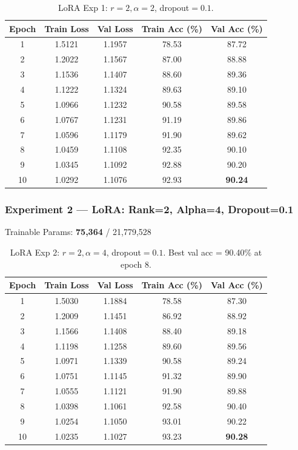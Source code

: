 \documentclass[11pt,a4paper]{article}
\begin{document}
\begin{table}[H]
\centering
\begin{tabular}{@{}ccccc@{}}
\toprule
\textbf{Epoch} & \textbf{Train Loss} & \textbf{Val Loss} & \textbf{Train Acc (\%)} & \textbf{Val Acc (\%)} \\
\midrule
1  & 1.5121 & 1.1957 & 78.53 & 87.72 \\
2  & 1.2022 & 1.1567 & 87.00 & 88.88 \\
3  & 1.1536 & 1.1407 & 88.60 & 89.36 \\
4  & 1.1222 & 1.1324 & 89.63 & 89.10 \\
5  & 1.0966 & 1.1232 & 90.58 & 89.58 \\
6  & 1.0767 & 1.1231 & 91.19 & 89.86 \\
7  & 1.0596 & 1.1179 & 91.90 & 89.62 \\
8  & 1.0459 & 1.1108 & 92.35 & 90.10 \\
9  & 1.0345 & 1.1092 & 92.88 & 90.20 \\
10 & 1.0292 & 1.1076 & 92.93 & \textbf{90.24} \\
\bottomrule
\end{tabular}
\caption{LoRA Exp 1: $r=2, \alpha=2$, dropout$=0.1$.}
\end{table}

\subsubsection*{Experiment 2 — LoRA: Rank=2, Alpha=4, Dropout=0.1}
\begin{center}
\small Trainable Params: \textbf{75,364} / 21,779,528
\end{center}

\begin{table}[H]
\centering
\begin{tabular}{@{}ccccc@{}}
\toprule
\textbf{Epoch} & \textbf{Train Loss} & \textbf{Val Loss} & \textbf{Train Acc (\%)} & \textbf{Val Acc (\%)} \\
\midrule
1  & 1.5030 & 1.1884 & 78.58 & 87.30 \\
2  & 1.2009 & 1.1451 & 86.92 & 88.92 \\
3  & 1.1566 & 1.1408 & 88.40 & 89.18 \\
4  & 1.1198 & 1.1258 & 89.60 & 89.56 \\
5  & 1.0971 & 1.1339 & 90.58 & 89.24 \\
6  & 1.0751 & 1.1145 & 91.32 & 89.90 \\
7  & 1.0555 & 1.1121 & 91.90 & 89.88 \\
8  & 1.0398 & 1.1061 & 92.58 & 90.40 \\
9  & 1.0254 & 1.1050 & 93.01 & 90.22 \\
10 & 1.0235 & 1.1027 & 93.23 & \textbf{90.28} \\
\bottomrule
\end{tabular}
\caption{LoRA Exp 2: $r=2, \alpha=4$, dropout$=0.1$. Best val acc = 90.40\% at epoch 8.}
\end{table}
\end{document}

